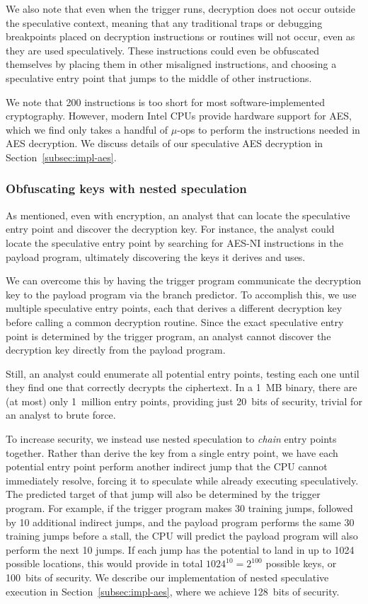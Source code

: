 We also note that even when the trigger runs, decryption does not occur outside
the speculative context, meaning that any traditional traps or debugging
breakpoints placed on decryption instructions or routines will not occur, even
as they are used speculatively. These instructions could even be obfuscated themselves by
placing them in other misaligned instructions, and choosing a speculative entry
point that jumps to the middle of other instructions.


We note that 200 instructions is too short for most software-implemented
cryptography. However, modern Intel CPUs provide hardware support for AES, which
we find only takes a handful of $\mu$-ops to perform the instructions needed in
AES decryption. We discuss details of our speculative AES decryption in
Section~\ref{subsec:impl-aes}.


\subsubsection{Obfuscating keys with nested speculation}
\label{subsec:nested-spec}


As mentioned, even with encryption, an analyst that can locate the
speculative entry point and discover the decryption key. For instance, the
analyst could locate the speculative entry point by searching for AES-NI
instructions in the payload program, ultimately discovering the keys it derives
and uses.

We can overcome
this by having the trigger program communicate the decryption key to the payload
program via the branch predictor. To accomplish this, we use multiple speculative
entry points, each that derives a
different decryption key before calling a common decryption routine. Since
the exact speculative entry point is determined by the trigger program, an
analyst cannot discover the decryption key directly from the payload program.

Still, an analyst could enumerate all potential entry points, testing each one
until they find one that correctly decrypts the ciphertext. In a 1~MB binary,
there are (at most) only 1~million entry points, providing just 20~bits of
security, trivial for an analyst to brute force.

To increase security, we instead use nested speculation to \emph{chain} entry points
together. Rather than derive
the key from a single entry point, we have each potential entry point perform
another indirect jump that the CPU cannot immediately resolve, forcing it to
speculate while already executing speculatively. The predicted target of that jump
will also be determined by the trigger program. For example, if the trigger
program makes 30 training jumps, followed by 10 additional indirect jumps, and
the payload program performs the same 30 training jumps before a stall, the CPU
will predict the payload program will also perform the next 10 jumps. If each
jump has the potential to land in up to 1024 possible locations, this would
provide in total $1024^{10} = 2^{100}$ possible keys, or 100~bits of security.
We describe our implementation of nested speculative execution in
Section~\ref{subsec:impl-aes}, where we achieve 128~bits of security.


